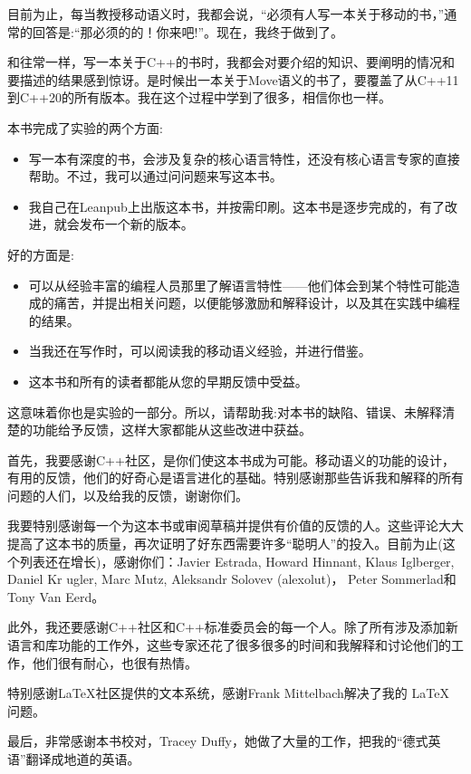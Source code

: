 
目前为止，每当教授移动语义时，我都会说，“必须有人写一本关于移动的书，”通常的回答是:“那必须的的！你来吧!”。现在，我终于做到了。\par

和往常一样，写一本关于C++的书时，我都会对要介绍的知识、要阐明的情况和要描述的结果感到惊讶。是时候出一本关于Move语义的书了，要覆盖了从C++11到C++20的所有版本。我在这个过程中学到了很多，相信你也一样。 \par


本书完成了实验的两个方面:\par
\begin{itemize}
  \item 写一本有深度的书，会涉及复杂的核心语言特性，还没有核心语言专家的直接帮助。不过，我可以通过问问题来写这本书。
  \item 我自己在Leanpub上出版这本书，并按需印刷。这本书是逐步完成的，有了改进，就会发布一个新的版本。
\end{itemize}

好的方面是:\par
\begin{itemize}
  \item 可以从经验丰富的编程人员那里了解语言特性——他们体会到某个特性可能造成的痛苦，并提出相关问题，以便能够激励和解释设计，以及其在实践中编程的结果。
  \item 当我还在写作时，可以阅读我的移动语义经验，并进行借鉴。
  \item 这本书和所有的读者都能从您的早期反馈中受益。
\end{itemize}

这意味着你也是实验的一部分。所以，请帮助我:对本书的缺陷、错误、未解释清楚的功能给予反馈，这样大家都能从这些改进中获益。\par


首先，我要感谢C++社区，是你们使这本书成为可能。移动语义的功能的设计，有用的反馈，他们的好奇心是语言进化的基础。特别感谢那些告诉我和解释的所有问题的人们，以及给我的反馈，谢谢你们。\par

我要特别感谢每一个为这本书或审阅草稿并提供有价值的反馈的人。这些评论大大提高了这本书的质量，再次证明了好东西需要许多“聪明人”的投入。目前为止(这个列表还在增长)，感谢你们：Javier Estrada, Howard Hinnant, Klaus Iglberger, Daniel Kr ugler, Marc Mutz, Aleksandr Solovev (alexolut)， Peter Sommerlad和Tony Van Eerd。\par

此外，我还要感谢C++社区和C++标准委员会的每一个人。除了所有涉及添加新语言和库功能的工作外，这些专家还花了很多很多的时间和我解释和讨论他们的工作，他们很有耐心，也很有热情。\par

特别感谢LaTeX社区提供的文本系统，感谢Frank Mittelbach解决了我的 \LaTeX\xspace 问题。\par

最后，非常感谢本书校对，Tracey Duffy，她做了大量的工作，把我的“德式英语”翻译成地道的英语。\par
